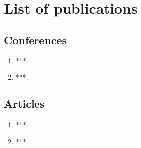  \chapter{List of publications}\label{app-C}

 \section{Conferences}

 \begin{enumerate}
 \item ***.
 \item ***.
 \end{enumerate}

 \section{Articles}

 \begin{enumerate}
 \item ***.
 \item ***.
 \end{enumerate} 